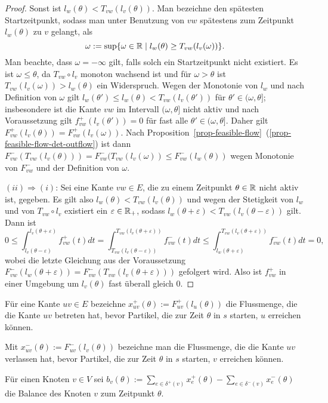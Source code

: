 \begin{proof}
	Sonst ist $l_w(\theta) < T_{vw}(l_v(\theta))$.
	Man bezeichne den spätesten Startzeitpunkt, sodass man unter Benutzung von $vw$ spätestens zum Zeitpunkt $l_w(\theta)$ zu $v$ gelangt, als
	$$\omega:=\sup\{ \omega\in\mathbb{R} \mid l_w(\theta) \geq T_{vw}(l_v(\omega)) \}.$$ 
	Man beachte, dass $\omega=-\infty$ gilt, falls solch ein Startzeitpunkt nicht existiert.
	Es ist $\omega \leq \theta$, da $T_{vw}\circ l_v$ monoton wachsend ist und für $\omega > \theta$ ist $T_{vw}(l_v(\omega)) > l_w(\theta)$ ein Widerspruch.
	Wegen der Monotonie von $l_w$ und nach Definition von $\omega$ gilt $l_w(\theta')\leq l_w(\theta)< T_{vw}(l_v(\theta'))$ für $\theta'\in (\omega, \theta]$;
	insbesondere ist die Kante $vw$ im Intervall $(\omega, \theta]$ nicht aktiv und nach Voraussetzung gilt $f_{vw}^+(l_v(\theta')) = 0$ für fast alle $\theta'\in (\omega, \theta]$.
	Daher gilt $F_{vw}^+(l_v(\theta)) = F_{vw}^+(l_v(\omega))$. Nach Proposition~\ref{prop-feasible-flow}~(\ref{prop-feasible-flow-det-outflow}) ist dann $F_{vw}^-(T_{vw}(l_v(\theta))) = F_{vw}^-(T_{vw}(l_v(\omega))\leq F_{vw}^-(l_w(\theta))$ wegen Monotonie von $F_{vw}^-$ und der Definition von $\omega$.
	
	$(ii) \Rightarrow (i)$: Sei eine Kante $vw\in E$, die zu einem Zeitpunkt $\theta\in\mathbb{R}$ nicht aktiv ist, gegeben.
	Es gilt also $l_w(\theta) < T_{vw}(l_v(\theta))$ und wegen der Stetigkeit von $l_w$ und von $T_{vw}\circ l_v$ existiert ein $\varepsilon\in\mathbb{R}_+$, sodass $l_w(\theta + \varepsilon) < T_{vw}(l_v(\theta - \varepsilon))$ gilt.
	Dann ist 
	$$
	0
	\leq \int_{l_v(\theta-\varepsilon)}^{l_v(\theta + \varepsilon)}f_{vw}^+(t) dt
	= \int_{T_{vw}(l_v(\theta-\varepsilon))}^{T_{vw}(l_v(\theta+\varepsilon))} f_{vw}^-(t) dt
	\leq \int_{l_w(\theta + \varepsilon)}^{T_{vw}(l_v(\theta + \varepsilon))} f_{vw}^-(t) dt
	= 0,
	$$
	wobei die letzte Gleichung aus der Voraussetzung $F_{vw}^-(l_w(\theta+\varepsilon)) = F_{vw}^-(T_{vw}(l_v(\theta + \varepsilon)))$ gefolgert wird.
	 Also ist $f_{vw}^+$ in einer Umgebung um $l_v(\theta)$ fast überall gleich $0$.
	
\end{proof}



\begin{definition}
	Für eine Kante $uv\in E$ bezeichne $x_{uv}^+(\theta):= F_{uv}^+(l_u(\theta))$ die Flussmenge, die die Kante $uv$ betreten hat, bevor Partikel, die zur Zeit $\theta$ in $s$ starten, $u$ erreichen können.
	
	Mit $x_{uv}^-(\theta):= F^-_{uv}(l_v(\theta))$ bezeichne man die Flussmenge, die die Kante $uv$ verlassen hat, bevor Partikel, die zur Zeit $\theta$ in $s$ starten, $v$ erreichen können.
	
	Für einen Knoten $v\in V$ sei $b_v(\theta):=\sum_{e\in\delta^+(v)} x_e^+(\theta) - \sum_{e\in\delta^-(v)} x_e^-(\theta)$ die Balance des Knoten $v$ zum Zeitpunkt $\theta$.
\end{definition}


